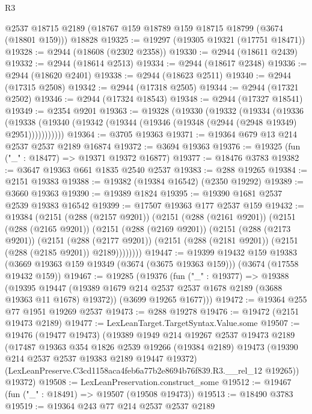 \begin{lexlean}{R3}
\begin{coremodule}
    @2537
    @18715
    @2189
    (@18767 @159 @18789 @159 @18715 @18799 (@3674 (@18801 @159)))
    @18828
@19325 := @19297 (@19305 @19321 (@17751 @18471))
@19328 := @2944 (@18608 (@2302 @2358))
@19330 := @2944 (@18611 @2439)
@19332 := @2944 (@18614 @2513)
@19334 := @2944 (@18617 @2348)
@19336 := @2944 (@18620 @2401)
@19338 := @2944 (@18623 @2511)
@19340 := @2944 (@17315 @2508)
@19342 := @2944 (@17318 @2505)
@19344 := @2944 (@17321 @2502)
@19346 := @2944 (@17324 @18543)
@19348 := @2944 (@17327 @18541)
@19349 := @2354 @9201
@19363 := @19328
    (@19330
      (@19332
        (@19334
          (@19336
            (@19338 (@19340 (@19342 (@19344 (@19346 (@19348 (@2944 (@2948 @19349) @2951)))))))))))
@19364 := @3705 @19363
@19371 := @19364 @679 @13 @214 @2537 @2537 @2189 @16874
@19372 := @3694 @19363
@19376 := @19325 (fun ("_" : @18477) => @19371 @19372 @16877)
@19377 := @18476 @3783
@19382 := @3647 @19363 @661 @1835 @2540 @2537
@19383 := @288 @19265
@19384 := @2151 @19383
@19388 := @19382 (@19384 @16542) (@2350 @19292)
@19389 := @3660 @19363
@19390 := @19389 @1824
@19395 := @19390 @1681 @2537 @2539 @19383 @16542
@19399 := @17507 @19363 @177 @2537 @159
@19432 := @19384
    (@2151
      (@288 (@2157 @9201))
      (@2151
        (@288 (@2161 @9201))
        (@2151
          (@288 (@2165 @9201))
          (@2151
            (@288 (@2169 @9201))
            (@2151
              (@288 (@2173 @9201))
              (@2151
                (@288 (@2177 @9201))
                (@2151 (@288 (@2181 @9201)) (@2151 (@288 (@2185 @9201)) @2189))))))))
@19447 := @19399
    @19432
    @159
    @19383
    (@3669 @19363 @159 @19349 (@3674 (@3675 @19363 @159)))
    (@3674 (@17558 @19432 @159))
@19467 := @19285
    (@19376
      (fun ("_" : @19377) =>
      @19388
        (@19395 @19447 (@19389 @1679 @214 @2537 @2537 @1678 @2189 (@3688 @19363 @11 @1678) @19372))
        (@3699 @19265 @1677)))
@19472 := @19364 @255 @77 @1951 @19269 @2537
@19473 := @288 @19278
@19476 := @19472 (@2151 @19473 @2189)
@19477 := LexLeanTarget.TargetSyntax.Value.some
@19507 := @19476
    (@19477 @19473)
    (@19389
      @1949
      @214
      @19267
      @2537
      @19473
      @2189
      (@17487
        @19363
        @354
        @1826
        @2539
        @19266
        (@19384 @2189)
        @19473
        (@19390 @214 @2537 @2537 @19383 @2189 @19447 @19372)
        (LexLeanPreserve.C3cd1158aca4feb6a77b2e8694b76f839.R3.__rel_12 @19265))
      @19372)
@19508 := LexLeanPreservation.construct_some
@19512 := @19467 (fun ("_" : @18491) => @19507 (@19508 @19473))
@19513 := @18490 @3783
@19519 := @19364 @243 @77 @214 @2537 @2537 @2189

\end{coremodule}
\end{lexlean}
